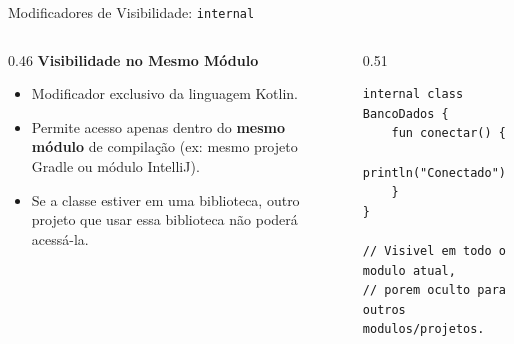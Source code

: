 \documentclass[aspectratio=169]{beamer}
\begin{document}
\begin{frame}[fragile]{Modificadores de Visibilidade: \texttt{internal}}
  \begin{columns}[T]
    \begin{column}{0.46\textwidth}
      \textbf{Visibilidade no Mesmo Módulo}
      \vspace{0.3em}
      \begin{itemize}\small
        \item Modificador exclusivo da linguagem Kotlin.
        \item Permite acesso apenas dentro do \textbf{mesmo módulo} de compilação (ex: mesmo projeto Gradle ou módulo IntelliJ).
        \item Se a classe estiver em uma biblioteca, outro projeto que usar essa biblioteca não poderá acessá-la.
      \end{itemize}
    \end{column}
    \begin{column}{0.51\textwidth}
\begin{lstlisting}[style=KotlinStyle]
internal class BancoDados {
    fun conectar() {
        println("Conectado")
    }
}

// Visivel em todo o modulo atual,
// porem oculto para outros modulos/projetos.
\end{lstlisting}
    \end{column}
  \end{columns}
\end{frame}
\end{document}
